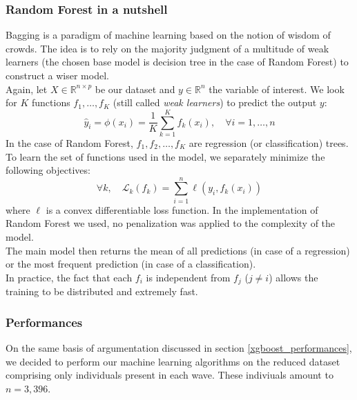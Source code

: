 \documentclass[]{article}
\begin{document}
\subsubsection{Random Forest in a nutshell}
Bagging is a paradigm of machine learning based on the notion of wisdom of crowds. The idea is to rely on the majority judgment of a multitude of weak learners (the chosen base model is decision tree in the case of Random Forest) to construct a wiser model.\\

\noindent
Again, let $X\in \mathbb{R}^{n\times p}$ be our dataset and $y\in \mathbb{R}^n$ the variable of interest. We look for $K$ functions $f_1,\dots,f_K$ (still called \textit{weak learners}) to predict the output $y$:
\begin{equation}
	\hat{y}_i = \phi(x_i) = \frac{1}{K}\sum_{k=1}^K f_k(x_i),\quad \forall i=1, \dots, n
\end{equation}
In the case of Random Forest, $f_1,f_2,\dots,f_K$ are regression (or classification) trees.\\
To learn the set of functions used in the model, we separately minimize the following objectives:
\begin{equation}
	\label{randomForest_objective}
	\forall k, \quad \mathcal{L}_k(f_k) = \sum_{i=1}^n \ell(y_i, f_k(x_i))
\end{equation}
where $\ell$ is a convex differentiable loss function. In the implementation of Random Forest we used, no penalization was applied to the complexity of the model.\\
The main model then returns the mean of all predictions (in case of a regression) or the most frequent prediction (in case of a classification).\\

\noindent
In practice, the fact that each $f_i$ is independent from $f_j$ ($j\ne i$) allows the training to be distributed and extremely fast.
\subsubsection{Performances}
\label{randomForest_performances}
On the same basis of argumentation discussed in section \ref{xgboost_performances}, we decided to perform our machine learning algorithms on the reduced dataset comprising only individuals present in each wave. These indiviuals amount to $n = 3,396$.\\
\end{document}
